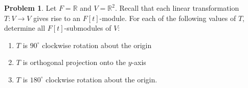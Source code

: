\documentclass[letterpaper,11pt]{amsart}
\theoremstyle{plain}
\theoremstyle{definition}
\newtheorem{pr}{Problem}
\theoremstyle{remark}
\begin{document}
\begin{pr}
    Let $F = \mathbb{R}$ and $V = \mathbb{R}^2$.
    Recall that each linear transformation $T: V \rightarrow V$ gives rise to an $F[t]$-module.
    For each of the following values of $T$, determine all $F[t]$-submodules of $V$:
    \begin{enumerate}
        \item $T$ is $90^\circ$ clockwise rotation about the origin
        \item $T$ is orthogonal projection onto the $y$-axis
        \item $T$ is $180^\circ$ clockwise rotation about the origin.
    \end{enumerate}
\end{pr}
\end{document}
